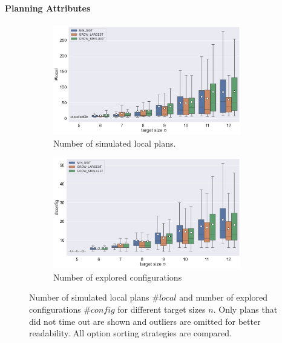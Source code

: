 \paragraph{Planning Attributes}

\begin{figure}
	\centering
	\begin{subfigure}[b]{\textwidth}
		\centering
		\includegraphics[width=0.9\textwidth]{figures/plots/AFN_nlocal.pdf}
		\caption{Number of simulated local plans.}
		\label{fig:AFN_nlocal}
	\end{subfigure}
	
	\begin{subfigure}[b]{\textwidth}
		\centering
		\includegraphics[width=0.9\textwidth]{figures/plots/AFN_nconfig.pdf}
		\caption{Number of explored configurations}
		\label{fig:AFN_nconfig}
	\end{subfigure}
	\caption[$\#\textit{config}$ and $\#\textit{config}$ for different target sizes]{Number of simulated local plans $\#\textit{local}$ and number of explored configurations $\#\textit{config}$ for different target sizes $n$. Only plans that did not time out are shown and outliers are omitted for better readability. All option sorting strategies are compared.}
	\label{fig:AFN_planstats}
\end{figure}

